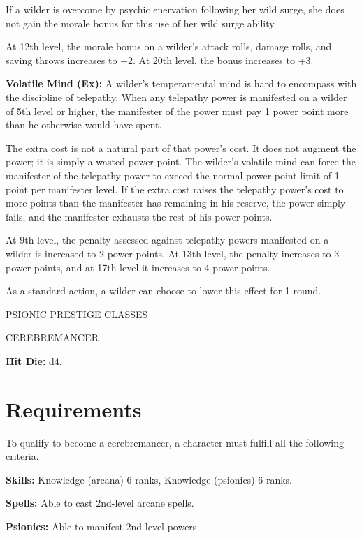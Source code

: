 \documentclass{article}
\begin{document}
If a wilder is overcome by psychic enervation following her wild surge, she does 
not gain the morale bonus for this use of her wild surge ability.

At 12th level, the morale bonus on a wilder's attack rolls, damage rolls, and saving 
throws increases to +2. At 20th level, the bonus increases to +3.

\textbf{Volatile Mind (Ex): }A wilder's temperamental mind is hard to encompass 
with the discipline of telepathy. When any telepathy power is manifested on a wilder 
of 5th level or higher, the manifester of the power must pay 1 power point more 
than he otherwise would have spent.

The extra cost is not a natural part of that power's cost. It does not augment 
the power; it is simply a wasted power point. The wilder's volatile mind can force 
the manifester of the telepathy power to exceed the normal power point limit of 
1 point per manifester level. If the extra cost raises the telepathy power's cost 
to more points than the manifester has remaining in his reserve, the power simply 
fails, and the manifester exhausts the rest of his power points.

At 9th level, the penalty assessed against telepathy powers manifested on a wilder 
is increased to 2 power points. At 13th level, the penalty increases to 3 power 
points, and at 17th level it increases to 4 power points.

As a standard action, a wilder can choose to lower this effect for 1 round.

\vspace{12pt}
{\LARGE{}PSIONIC PRESTIGE CLASSES}

\vspace{12pt}
{\LARGE{}CEREBREMANCER}

\textbf{Hit Die:} d4.

\vspace{12pt}
\section*{\textbf{Requirements}}

To qualify to become a cerebremancer, a character must fulfill all the following 
criteria.

\textbf{Skills:} Knowledge (arcana) 6 ranks, Knowledge (psionics) 6 ranks.

\textbf{Spells:} Able to cast 2nd-level arcane spells.

\textbf{Psionics:} Able to manifest 2nd-level powers.
\end{document}
